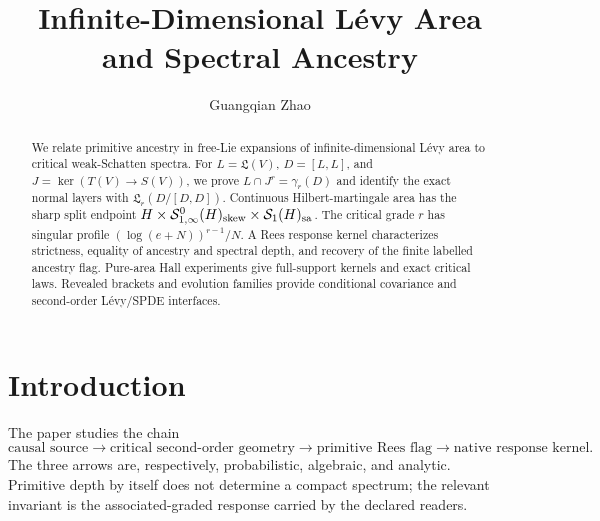 \documentclass[10pt,reqno]{amsart}
\theoremstyle{plain}
\theoremstyle{definition}
\theoremstyle{remark}
\begin{document}
\title[L\'evy area and spectral ancestry]{Infinite-Dimensional L\'evy Area and Spectral Ancestry}
\author{Guangqian Zhao}
\address{School of Mathematical Sciences, University of Science and Technology of China, Hefei, Anhui 230026, China}
\date{}

\begin{abstract}
We relate primitive ancestry in free-Lie expansions of infinite-dimensional
L\'evy area to critical weak-Schatten spectra.  For
$L=\mathfrak L(V)$, $D=[L,L]$, and $J=\ker(T(V)\to S(V))$, we prove
$L\cap J^r=\gamma_r(D)$ and identify the exact normal layers with
$\mathfrak L_r(D/[D,D])$.  Continuous Hilbert-martingale area has the sharp
split endpoint
$H\times\mathcal S^0_{1,\infty}(H)_{\rm skew}\times\mathcal S_1(H)_{\rm sa}$.
The critical grade $r$ has singular profile
$(\log(e+N))^{r-1}/N$.  A Rees response kernel characterizes strictness,
equality of ancestry and spectral depth, and recovery of the finite labelled
ancestry flag.  Pure-area Hall experiments give full-support kernels and exact
critical laws.  Revealed brackets and evolution families provide conditional
covariance and second-order L\'evy/SPDE interfaces.
\end{abstract}

\maketitle

\section{Introduction}
\label{sec:introduction}

The paper studies the chain
\begin{equation}
 \text{causal source}
 \longrightarrow
 \text{critical second-order geometry}
 \longrightarrow
 \text{primitive Rees flag}
 \longrightarrow
 \text{native response kernel}.
 \label{eq:main-architecture}
\end{equation}
The three arrows are, respectively, probabilistic, algebraic, and analytic.
Primitive depth by itself does not determine a compact spectrum; the relevant
invariant is the associated-graded response carried by the declared readers.
\end{document}
